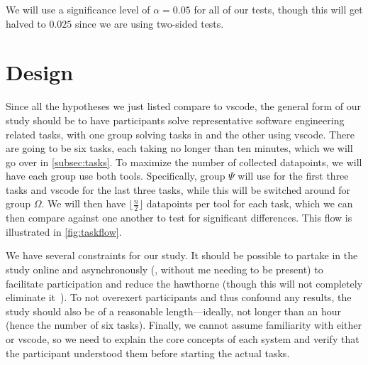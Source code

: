 \documentclass[../thesis]{subfiles}
\begin{document}
We will use a significance level of $\alpha = 0.05$ for all of our tests, though this will get halved to $0.025$ since we are using two-sided tests.

\section{Design}\label{sec:design}
Since all the hypotheses we just listed compare \SEE{} to \gls{vscode}, the general form of our study should be to have participants solve representative software engineering related tasks, with one group solving tasks in \SEE{} and the other using \gls{vscode}.
There are going to be six tasks, each taking no longer than ten minutes, which we will go over in \cref{subsec:tasks}.
To maximize the number of collected datapoints, we will have each group use both tools.
Specifically, group $\Psi$ will use \SEE{} for the first three tasks and \gls{vscode} for the last three tasks, while this will be switched around for group $\Omega$.
We will then have $\lfloor \frac{n}{2} \rfloor$ datapoints per tool for each task, which we can then compare against one another to test for significant differences.
This flow is illustrated in \cref{fig:taskflow}.

We have several constraints for our study.
It should be possible to partake in the study online and asynchronously (\ie, without me needing to be present) to facilitate participation and reduce the \gls{hawthorne} (though this will not completely eliminate it~\cite[\eg][]{evans2010}).
To not overexert participants and thus confound any results, the study should also be of a reasonable length---ideally, not longer than an hour (hence the number of six tasks).
Finally, we cannot assume familiarity with either \SEE{} or \gls{vscode}, so we need to explain the core concepts of each system and verify that the participant understood them before starting the actual tasks.

\newcommand{\cyes}{\textcolor{ForestGreen}{\textbf{[\ding{51}]}}}
\newcommand{\chmm}{\textcolor{BurntOrange}{\textbf{[\textit{?}]}}}
\newcommand{\cno}{\textcolor{Maroon}{\textbf{[\ding{55}]}}}
\end{document}
